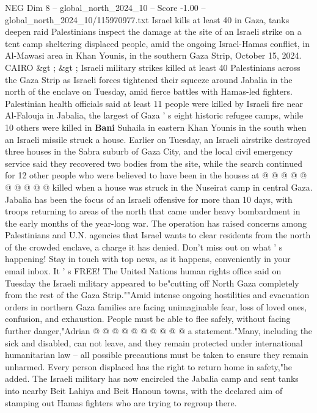 \begin{textsample}{NEG Dim 8 – global\_north\_2024\_10 – Score -1.00 – global\_north\_2024\_10/115970977.txt}  \label{ex:f8_neg_298}
Israel kills at least 40 in Gaza, tanks deepen raid Palestinians inspect the damage at the site of an Israeli strike on a tent camp sheltering displaced people, amid the ongoing Israel-Hamas conflict, in Al-Mawasi area in Khan Younis, in the southern Gaza Strip, October 15, 2024.
CAIRO \&gt ; \&gt ; Israeli military strikes killed at least 40 Palestinians across the Gaza Strip as Israeli forces tightened their squeeze around Jabalia in the north of the enclave on Tuesday, amid fierce battles with Hamas-led fighters.
Palestinian health officials said at least 11 people were killed by Israeli fire near Al-Falouja in Jabalia, the largest of Gaza ' s eight historic refugee camps, while 10 others were killed in \textbf{Bani} Suhaila in eastern Khan Younis in the south when an Israeli missile struck a house.
Earlier on Tuesday, an Israeli airstrike destroyed three houses in the Sabra suburb of Gaza City, and the local civil emergency service said they recovered two bodies from the site, while the search continued for 12 other people who were believed to have been in the houses at @ @ @ @ @ @ @ @ @ @ killed when a house was struck in the Nuseirat camp in central Gaza.
Jabalia has been the focus of an Israeli offensive for more than 10 days, with troops returning to areas of the north that came under heavy bombardment in the early months of the year-long war.
The operation has raised concerns among Palestinians and U.N. agencies that Israel wants to clear residents from the north of the crowded enclave, a charge it has denied.
Don't miss out on what ' s happening!
Stay in touch with top news, as it happens, conveniently in your email inbox.
It ' s FREE!
The United Nations human rights office said on Tuesday the Israeli military appeared to be"cutting off North Gaza completely from the rest of the Gaza Strip.""Amid intense ongoing hostilities and evacuation orders in northern Gaza families are facing unimaginable fear, loss of loved ones, confusion, and exhaustion.
People must be able to flee safely, without facing further danger,"Adrian @ @ @ @ @ @ @ @ @ @ a statement."Many, including the sick and disabled, can not leave, and they remain protected under international humanitarian law -- all possible precautions must be taken to ensure they remain unharmed.
Every person displaced has the right to return home in safety,"he added.
The Israeli military has now encircled the Jabalia camp and sent tanks into nearby Beit Lahiya and Beit Hanoun towns, with the declared aim of stamping out Hamas fighters who are trying to regroup there.

\end{textsample}
